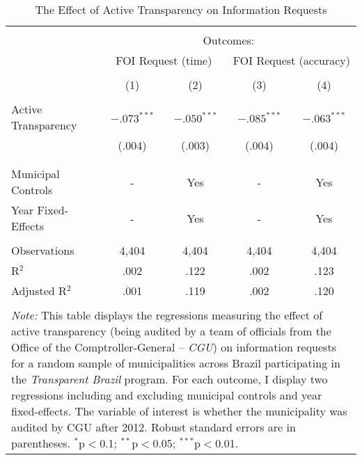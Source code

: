 
\begin{table}[!htbp] \centering
  \caption{The Effect of Active Transparency on Information Requests}
  \label{tab:transparency2}
\scriptsize
\begin{tabular}{@{\extracolsep{5pt}}lcccc}
\\[-1.8ex]\hline
\hline \\[-1.8ex]
& \multicolumn{4}{c}{Outcomes:} \T \B \\
\cline{2-5}
 & \multicolumn{2}{c}{FOI Request (time)} & \multicolumn{2}{c}{FOI Request (accuracy)} \T \B \\
\\[-1.8ex] & \multicolumn{1}{c}{(1)} & \multicolumn{1}{c}{(2)} & \multicolumn{1}{c}{(3)} & \multicolumn{1}{c}{(4)} \B \\
\hline \\[-1.8ex]
 Active Transparency & $-.073^{***}$ & $-.050^{***}$ & $-.085^{***}$ & $-.063^{***}$ \\
                     & (.004) & (.003) & (.004) & (.004) \\
                     & & & & \\
\hline \\[-1.8ex]
Municipal Controls & \multicolumn{1}{c}{-} & \multicolumn{1}{c}{Yes} & \multicolumn{1}{c}{-} & \multicolumn{1}{c}{Yes} \\
Year Fixed-Effects & \multicolumn{1}{c}{-} & \multicolumn{1}{c}{Yes} & \multicolumn{1}{c}{-} & \multicolumn{1}{c}{Yes} \\
\hline \\[-1.8ex]
Observations & \multicolumn{1}{c}{4,404} & \multicolumn{1}{c}{4,404} & \multicolumn{1}{c}{4,404} & \multicolumn{1}{c}{4,404} \\
R$^{2}$ & \multicolumn{1}{c}{.002} & \multicolumn{1}{c}{.122} & \multicolumn{1}{c}{.002} & \multicolumn{1}{c}{.123} \\
Adjusted R$^{2}$ & \multicolumn{1}{c}{.001} & \multicolumn{1}{c}{.119} & \multicolumn{1}{c}{.002} & \multicolumn{1}{c}{.120} \\
\hline
\hline \\[-1.8ex]
\multicolumn{5}{p{.6\textwidth}}{\emph{Note:} This table displays the regressions measuring the effect of active transparency (being audited by a team of officials from the Office of the Comptroller-General -- \emph{CGU}) on information requests for a random sample of municipalities across Brazil participating in the \emph{Transparent Brazil} program. For each outcome, I display two regressions including and excluding municipal controls and year fixed-effects. The variable of interest is whether the municipality was audited by CGU after 2012. Robust standard errors are in parentheses. $^{*}$p$<$0.1; $^{**}$p$<$0.05; $^{***}$p$<$0.01.}\\
\end{tabular}
\end{table}
